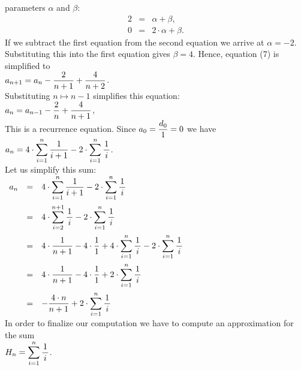 parameters $\alpha$ and $\beta$:
\begin{eqnarray*}
  2 & = & \alpha + \beta, \\
  0 & = & 2 \cdot \alpha + \beta.
\end{eqnarray*}
If we subtract the first equation from the second equation we arrive at
 $\alpha = -2$.  Substituting this into the first equation gives $\beta = 4$.
Hence,  equation (7) is simplified to
\\[0.2cm]
\hspace*{1.3cm}
$\displaystyle a_{n+1} = a_{n} - \frac{2}{n+1} + \frac{4}{n+2}$.
\\[0.2cm] 
Substituting $n \mapsto n-1$ simplifies this equation: 
\\[0.2cm]
\hspace*{1.3cm}
$\displaystyle a_{n} = a_{n-1} - \frac{2}{n} + \frac{4}{n+1}$,
\\[0.2cm] 
This is a  recurrence equation. 
Since $a_0 = \displaystyle\frac{d_0}{1} = 0$
we have
\\[0.2cm]
\hspace*{1.3cm}
$\displaystyle a_{n} = 4 \cdot \sum\limits_{i=1}^n \frac{1}{i+1} - 2 \cdot \sum\limits_{i=1}^n \frac{1}{\,i\,}$.  
\\[0.2cm]
Let us simplify this sum:
\\[0.2cm]
\hspace*{1.3cm}
$
\begin{array}{lcl}
 a_{n} & = & \displaystyle 4 \cdot \sum_{i=1}^n \frac{1}{i+1} - 2 \cdot \sum_{i=1}^n \frac{1}{\,i\,} \\[0.5cm]
       & = & \displaystyle 4 \cdot \sum_{i=2}^{n+1} \frac{1}{\,i\,} - 2 \cdot \sum_{i=1}^n \frac{1}{\,i\,} \\[0.5cm]
       & = & \displaystyle 4 \cdot \frac{1}{n+1} - 4 \cdot \frac{1}{1} + 4 \cdot \sum_{i=1}^{n} \frac{1}{\,i\,} - 2 \cdot \sum_{i=1}^n \frac{1}{\,i\,} \\[0.5cm]
       & = & \displaystyle 4 \cdot \frac{1}{n+1} - 4 \cdot \frac{1}{1} + 2 \cdot \sum_{i=1}^{n} \frac{1}{\,i\,}  \\[0.5cm]
       & = & \displaystyle - \frac{4 \cdot n}{n+1}  + 2 \cdot \sum_{i=1}^{n} \frac{1}{\,i\,}  
\end{array}
$
\\[0.2cm]
In order to finalize our computation we have to compute an approximation for the sum
\\[0.2cm]
\hspace*{1.3cm}
$H_n = \displaystyle\sum\limits_{i=1}^{n}\frac{1}{\,i\,}$.
\\[0.2cm] 
